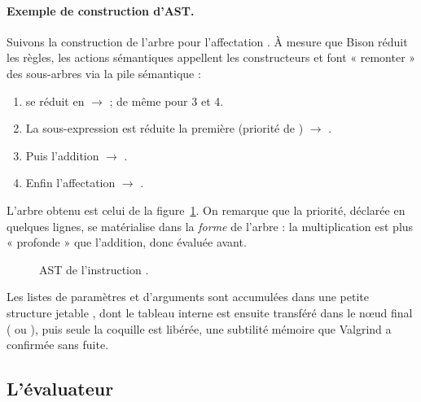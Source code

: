 \paragraph{Exemple de construction d'AST.} Suivons la construction de l'arbre pour
l'affectation . À mesure que Bison réduit les règles, les
actions sémantiques appellent les constructeurs et font « remonter » des
sous-arbres via la pile sémantique :

\begin{enumerate}
  \item {} se réduit en  $\to$  ;
        de même pour 3 et 4.
  \item La sous-expression  est réduite la première (priorité de
        \code{*}) $\to$ .
  \item Puis l'addition $\to$ .
  \item Enfin l'affectation $\to$ .
\end{enumerate}

L'arbre obtenu est celui de la figure~\ref{fig:ast-assign}. On remarque que la
priorité, déclarée en quelques lignes, se matérialise dans la \emph{forme} de
l'arbre : la multiplication est plus « profonde » que l'addition, donc évaluée
avant.

\begin{figure}[ht]
\centering
{}
\caption{AST de l'instruction .}
\label{fig:ast-assign}
\end{figure}

Les listes de paramètres et d'arguments sont accumulées dans une petite structure
jetable , dont le tableau interne est ensuite transféré dans le
n\oe ud final ( ou ), puis seule la
coquille est libérée, une subtilité mémoire que Valgrind a confirmée sans fuite.

\subsection{L'évaluateur}

